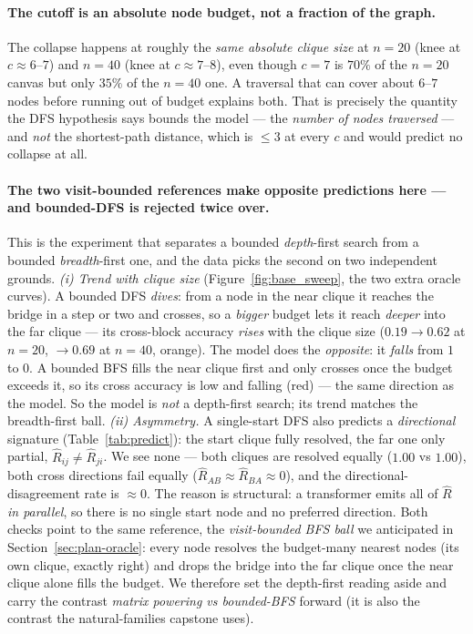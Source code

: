 \documentclass[11pt,a4paper]{article}
\begin{document}
\paragraph{The cutoff is an absolute node budget, not a fraction of the graph.} The collapse
happens at roughly the \emph{same absolute clique size} at $n=20$ (knee at $c\approx6$--$7$) and
$n=40$ (knee at $c\approx7$--$8$), even though $c=7$ is $70\%$ of the $n=20$ canvas but only $35\%$
of the $n=40$ one. A traversal that can cover about $6$--$7$ nodes before running out of budget
explains both. That is precisely the quantity the DFS hypothesis says bounds the model --- the
\emph{number of nodes traversed} --- and \emph{not} the shortest-path distance, which is $\le 3$
at every $c$ and would predict no collapse at all.

\paragraph{The two visit-bounded references make opposite predictions here --- and bounded-DFS is
rejected twice over.} This is the experiment that separates a bounded \emph{depth}-first search
from a bounded \emph{breadth}-first one, and the data picks the second on two independent grounds.
\emph{(i) Trend with clique size} (Figure~\ref{fig:base_sweep}, the two extra oracle curves). A
bounded DFS \emph{dives}: from a node in the near clique it reaches the bridge in a step or two and
crosses, so a \emph{bigger} budget lets it reach \emph{deeper} into the far clique --- its
cross-block accuracy \emph{rises} with the clique size ($0.19\to0.62$ at $n=20$, $\to0.69$ at
$n=40$, orange). The model does the \emph{opposite}: it \emph{falls} from $1$ to $0$. A bounded BFS
fills the near clique first and only crosses once the budget exceeds it, so its cross accuracy is
low and falling (red) --- the same direction as the model. So the model is \emph{not} a depth-first
search; its trend matches the breadth-first ball. \emph{(ii) Asymmetry.} A single-start DFS also
predicts a \emph{directional} signature (Table~\ref{tab:predict}): the start clique fully resolved,
the far one only partial, $\hat R_{ij}\neq\hat R_{ji}$. We see none --- both cliques are resolved
equally ($1.00$ vs $1.00$), both cross directions fail equally
($\hat R_{AB}\approx\hat R_{BA}\approx0$), and the directional-disagreement rate is $\approx0$. The
reason is structural: a transformer emits all of $\hat R$ \emph{in parallel}, so there is no single
start node and no preferred direction. Both checks point to the same reference, the
\emph{visit-bounded BFS ball} we anticipated in Section~\ref{sec:plan-oracle}: every node resolves
the budget-many nearest nodes (its own clique, exactly right) and drops the bridge into the far
clique once the near clique alone fills the budget. We therefore set the depth-first reading aside
and carry the contrast \emph{matrix powering vs bounded-BFS} forward (it is also the contrast the
natural-families capstone uses).
\end{document}
